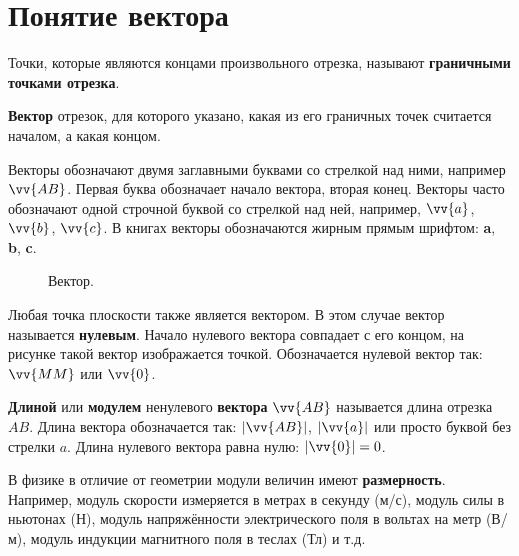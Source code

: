 \section{Понятие вектора}

Точки, которые являются концами произвольного отрезка, называют
\textbf{граничными точками отрезка}.

\textbf{Вектор} \bdash отрезок, для которого указано, какая из его
граничных точек считается началом, а какая \bdash концом.

Векторы обозначают двумя заглавными буквами со стрелкой над ними, например
$\vv{AB}$. Первая буква обозначает начало вектора, вторая \bdash конец.
Векторы часто обозначают одной строчной буквой со стрелкой над ней, например,
$\vv{a}$, $\vv{b}$, $\vv{c}$. В книгах векторы обозначаются жирным прямым шрифтом: 
\textbf{a}, \textbf{b}, \textbf{c}.

\begin{figure}[h]
  \centering
  \caption{\small Вектор.}\label{pic:vec}
\end{figure}

Любая точка плоскости также является вектором. В этом случае вектор называется
\textbf{нулевым}. Начало нулевого вектора совпадает с его концом, на рисунке
такой вектор изображается точкой. Обозначается нулевой вектор так: $\vv{MM}$ или $\vv{0}$.

\textbf{Длиной} или \textbf{модулем} ненулевого \textbf{вектора} $\vv{AB}$ называется длина отрезка $AB$.
Длина вектора обозначается так: $|\vv{AB}|$, $|\vv{a}|$ или просто буквой без стрелки $a$.
Длина нулевого вектора равна нулю: $|\vv{0}| = 0$.

В физике в отличие от геометрии модули величин имеют \textbf{размерность}.
Например, модуль скорости измеряется
в метрах в секунду (м/с), модуль силы \bdash в ньютонах (Н), модуль напряжённости электрического
поля \bdash в вольтах на метр (В/м), модуль индукции магнитного поля \bdash в теслах (Тл) и т.д.
